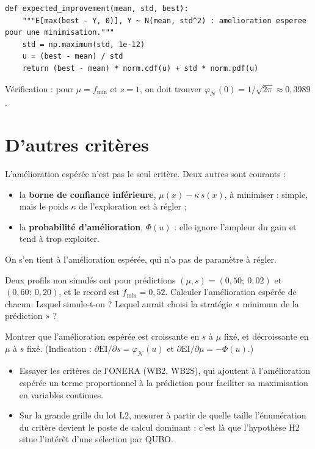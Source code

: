\begin{codebox}
\begin{lstlisting}
def expected_improvement(mean, std, best):
    """E[max(best - Y, 0)], Y ~ N(mean, std^2) : amelioration esperee pour une minimisation."""
    std = np.maximum(std, 1e-12)
    u = (best - mean) / std
    return (best - mean) * norm.cdf(u) + std * norm.pdf(u)
\end{lstlisting}
Vérification : pour $\mu=f_{\min}$ et $s=1$, on doit trouver $\varphi_{\mathcal N}(0)=1/\sqrt{2\pi}\approx0{,}3989$.
\end{codebox}

\section{D'autres critères}
L'amélioration espérée n'est pas le seul critère. Deux autres sont courants :
\begin{itemize}
\item la \textbf{borne de confiance inférieure}, $\mu(x)-\kappa\,s(x)$, à minimiser : simple, mais le poids $\kappa$ de l'exploration est à régler ;
\item la \textbf{probabilité d'amélioration}, $\Phi(u)$ : elle ignore l'ampleur du gain et tend à trop exploiter.
\end{itemize}
On s'en tient à l'amélioration espérée, qui n'a pas de paramètre à régler.

\exercices
\begin{exercice}
Deux profils non simulés ont pour prédictions $(\mu,s)=(0{,}50;\ 0{,}02)$ et $(0{,}60;\ 0{,}20)$, et le record est $f_{\min}=0{,}52$. Calculer l'amélioration espérée de chacun. Lequel simule-t-on ? Lequel aurait choisi la stratégie « minimum de la prédiction » ?
\end{exercice}
\begin{exercice}
Montrer que l'amélioration espérée est croissante en $s$ à $\mu$ fixé, et décroissante en $\mu$ à $s$ fixé. (Indication : $\partial\mathrm{EI}/\partial s=\varphi_{\mathcal N}(u)$ et $\partial\mathrm{EI}/\partial\mu=-\Phi(u)$.)
\end{exercice}

\begin{pistes}
\begin{itemize}
\item Essayer les critères de l'ONERA (WB2, WB2S), qui ajoutent à l'amélioration espérée un terme proportionnel à la prédiction pour faciliter sa maximisation en variables continues.
\item Sur la grande grille du lot L2, mesurer à partir de quelle taille l'énumération du critère devient le poste de calcul dominant : c'est là que l'hypothèse H2 situe l'intérêt d'une sélection par QUBO.
\end{itemize}
\end{pistes}
